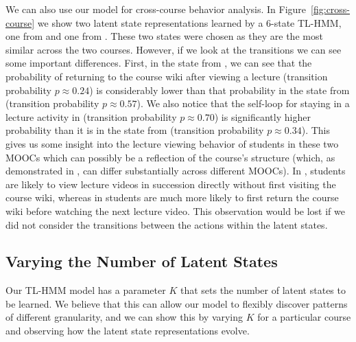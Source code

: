 We can also use our model for cross-course behavior analysis. In
Figure~\ref{fig:cross-course} we show two latent state representations
learned by a 6-state TL-HMM, one from \textretrieval{} and one from
\sustain{}. These two states were chosen as they are the most similar
across the two courses. However, if we look at the transitions we can see
some important differences. First, in the state from \textretrieval{}, we
can see that the probability of returning to the course wiki after viewing
a lecture (transition probability $p \approx 0.24$) is considerably lower
than that probability in the state from \sustain{} (transition probability
$p \approx 0.57$). We also notice that the self-loop for staying in a
lecture activity in \textretrieval{} (transition probability $p \approx
0.70$) is significantly higher probability than it is in the state from
\sustain{} (transition probability $p \approx 0.34$).  This gives us some
insight into the lecture viewing behavior of students in these two MOOCs
which can possibly be a reflection of the course's structure (which, as
demonstrated in \citet{Davis:2016:EDM}, can differ substantially across
different MOOCs).  In \textretrieval{}, students are likely to view lecture
videos in succession directly without first visiting the course wiki,
whereas in \sustain{} students are much more likely to first return the
course wiki before watching the next lecture video. This observation would
be lost if we did not consider the transitions between the actions within
the latent states.

\subsection{Varying the Number of Latent States}
Our TL-HMM model has a parameter $K$ that sets the number of latent states
to be learned. We believe that this can allow our model to flexibly
discover patterns of different granularity, and we can show this by varying
$K$ for a particular course and observing how the latent state
representations evolve.


